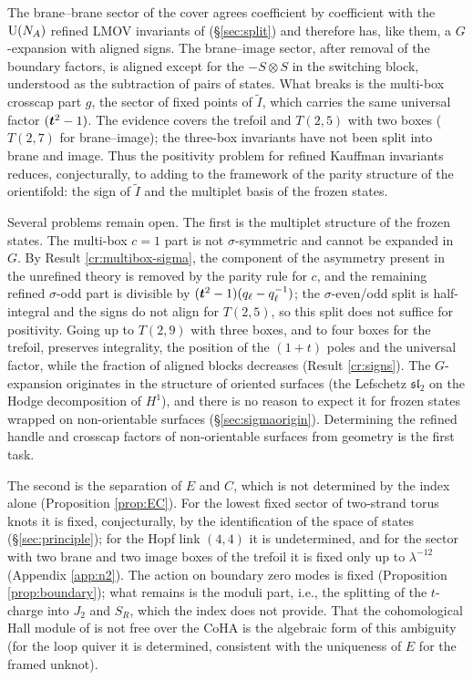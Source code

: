 The brane--brane sector of the cover agrees coefficient by coefficient with the $\mathrm{U}(N_A)$ refined LMOV invariants of \cite{KN17} (\S\ref{sec:split}) and therefore has, like them, a $G$-expansion with aligned signs. The brane--image sector, after removal of the boundary factors, is aligned except for the $-S\otimes S$ in the switching block, understood as the subtraction of pairs of states. What breaks is the multi-box crosscap part $g$, the sector of fixed points of $\tilde I$, which carries the same universal factor $(\bm{t}^2 - 1)$. The evidence covers the trefoil and $T(2,5)$ with two boxes ($T(2,7)$ for brane--image); the three-box invariants have not been split into brane and image. Thus the positivity problem for refined Kauffman invariants reduces, conjecturally, to adding to the framework of \cite{KN17} the parity structure of the orientifold: the sign of $\tilde I$ and the multiplet basis of the frozen states.

Several problems remain open. The first is the multiplet structure of the frozen states. The multi-box $c = 1$ part is not $\sigma$-symmetric and cannot be expanded in $G$. By Result \ref{cr:multibox-sigma}, the component of the asymmetry present in the unrefined theory is removed by the parity rule for $c$, and the remaining refined $\sigma$-odd part is divisible by $(\bm{t}^2-1)(q_\ell - q_\ell^{-1})$; the $\sigma$-even/odd split is half-integral and the signs do not align for $T(2,5)$, so this split does not suffice for positivity. Going up to $T(2,9)$ with three boxes, and to four boxes for the trefoil, preserves integrality, the position of the $(1+t)$ poles and the universal factor, while the fraction of aligned blocks decreases (Result \ref{cr:signs}). The $G$-expansion originates in the structure of oriented surfaces (the Lefschetz $\mathfrak{sl}_2$ on the Hodge decomposition of $H^1$), and there is no reason to expect it for frozen states wrapped on non-orientable surfaces (\S\ref{sec:sigmaorigin}). Determining the refined handle and crosscap factors of non-orientable surfaces from geometry is the first task.

The second is the separation of $E$ and $C$, which is not determined by the index alone (Proposition \ref{prop:EC}). For the lowest fixed sector of two-strand torus knots it is fixed, conjecturally, by the identification of the space of states (\S\ref{sec:principle}); for the Hopf link $(4,4)$ it is undetermined, and for the sector with two brane and two image boxes of the trefoil it is fixed only up to $\lambda^{-12}$ (Appendix \ref{app:n2}). The action on boundary zero modes is fixed (Proposition \ref{prop:boundary}); what remains is the moduli part, i.e., the splitting of the $t$-charge into $J_2$ and $S_R$, which the index does not provide. That the cohomological Hall module of \cite{Young16} is not free over the CoHA is the algebraic form of this ambiguity (for the loop quiver it is determined, consistent with the uniqueness of $E$ for the framed unknot).

